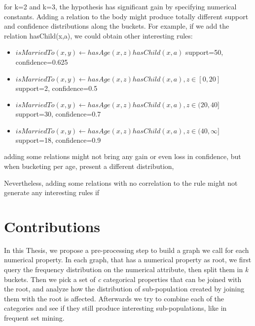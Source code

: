 for k=2 and k=3, the hypothesis has significant gain by specifying numerical constants. Adding a relation to the body might produce totally different support and confidence distributions along the buckets. For example, if we add the relation hasChild(x,a), we could obtain other interesting rules:
\begin{itemize}
 \item \begin{math}isMarriedTo(x,y) \leftarrow hasAge(x,z)hasChild(x,a)\end{math}	
    \newline support=50, confidence=0.625
 \item \begin{math}isMarriedTo(x,y) \leftarrow hasAge(x,z)hasChild(x,a), z\in[0,20]\end{math}	
    \newline support=2, confidence=0.5
 \item \begin{math}isMarriedTo(x,y) \leftarrow hasAge(x,z)hasChild(x,a), z\in(20,40]\end{math}	
    \newline support=30, confidence=0.7
 \item \begin{math}isMarriedTo(x,y) \leftarrow hasAge(x,z)hasChild(x,a), z\in(40,\infty]\end{math}	
    \newline support=18, confidence=0.9
\end{itemize}

adding some relations might not bring any gain or even loss in confidence, but when bucketing per age, present a different distribution, 

Nevertheless, adding some relations with no correlation to the rule might not generate any interesting rules if  

\section{Contributions}
In this Thesis, we propose a pre-processing step to build a graph we call \graphname for each numerical property. In each graph, that has a numerical property as root, we first query the frequency distribution on the numerical attribute, then split them in \emph{k} buckets. Then we pick a set of \emph{c} categorical properties that can be joined with the root, and analyze how the distribution of sub-population created by joining them with the root is affected. Afterwards we try to combine each of the categories and see if they still produce interesting sub-populations, like in frequent set mining.

